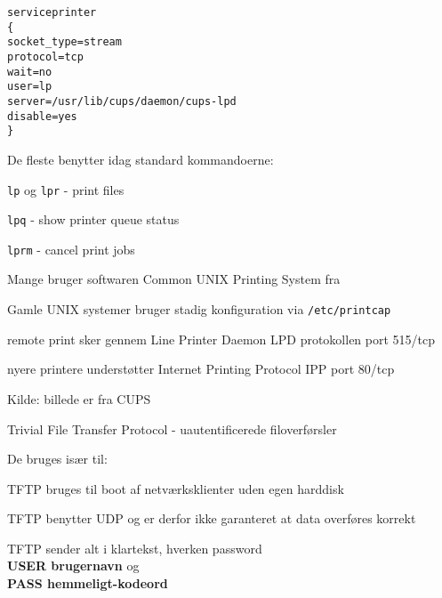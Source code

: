 \begin{alltt}
service printer
\{
        socket_type = stream
        protocol    = tcp
        wait        = no
        user        = lp
        server      = /usr/lib/cups/daemon/cups-lpd
        disable     = yes
\}  
\end{alltt}



\begin{list1}
\item De fleste benytter idag standard kommandoerne:
\begin{list2}
\item \verb+lp+ og \verb+lpr+ - print files
\item \verb+lpq+ - show printer queue status
\item \verb+lprm+ - cancel print jobs
\item Mange bruger softwaren Common UNIX Printing System fra
\item Gamle UNIX systemer bruger stadig konfiguration via
  \verb+/etc/printcap+ 
\item remote print sker gennem Line Printer Daemon LPD protokollen port 515/tcp
\item nyere printere understøtter Internet Printing Protocol IPP port 80/tcp
\end{list2}
\end{list1}

Kilde: billede er fra CUPS



\begin{list1}
\item Trivial File Transfer Protocol - uautentificerede filoverførsler
\item De bruges især til:
  \begin{list2}
\item TFTP bruges til boot af netværksklienter uden egen harddisk
\item TFTP benytter UDP og er derfor ikke garanteret at data overføres korrekt
  \end{list2}
\item TFTP sender alt i klartekst, hverken password \\ 
{\bfseries USER brugernavn} og \\
{\bfseries PASS hemmeligt-kodeord} 
\end{list1}


